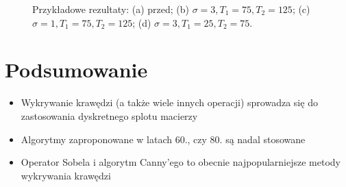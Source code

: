 \documentclass[a4paper,twocolumn,12pt]{article}
\begin{document}
\begin{figure}[!ht]
 \begin{center}
 \end{center}
 \caption{
  Przykładowe rezultaty:
  (a) przed;
  (b) $\sigma = 3, T_1 = 75, T_2 = 125$;
  (c) $\sigma = 1, T_1 = 75, T_2 = 125$;
  (d) $\sigma = 3, T_1 = 25, T_2 = 75$.
 }
 \label{fig:canny_comparison}
\end{figure}



\section{Podsumowanie}

\begin{itemize}
 \item Wykrywanie krawędzi (a także wiele innych operacji) sprowadza się do zastosowania dyskretnego splotu macierzy
 \item Algorytmy zaproponowane w latach 60., czy 80. są nadal stosowane
 \item Operator Sobela i algorytm Canny’ego to obecnie najpopularniejsze metody wykrywania krawędzi
\end{itemize}
\end{document}
